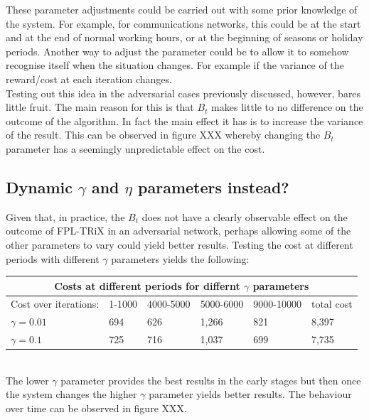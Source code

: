 These parameter adjustments could be carried out with some prior knowledge of the system. For example, for communications networks, this could be at the start and at the end of normal working hours, or at the beginning of seasons or holiday periods. Another way to adjust the parameter could be to allow it to somehow recognise itself when the situation changes. For example if the variance of the reward/cost at each iteration changes.\\

Testing out this idea in the adversarial cases previously discussed, however, bares little fruit. The main reason for this is that $B_t$ makes little to no difference on the outcome of the algorithm. In fact the main effect it has is to increase the variance of the result. This can be observed in figure XXX whereby changing the $B_t$ parameter has a seemingly unpredictable effect on the cost.\\


\subsection{Dynamic $\gamma$ and $\eta$ parameters instead?}

Given that, in practice, the $B_t$ does not have a clearly observable effect on the outcome of FPL-TRiX in an adversarial network, perhaps allowing some of the other parameters to vary could yield better results. Testing the cost at different periods with different $\gamma$ parameters yields the following:\\

\begin{tabular}{ |p{3cm}||p{1.5cm}|p{1.5cm}|p{1.5cm}|p{1.5cm}|p{1.5cm}|  }
 \hline
 \multicolumn{6}{|c|}{Costs at different periods for differnt $\gamma$ parameters}  \\
 \hline
 Cost over  iterations:& 1-1000  & 4000-5000 & 5000-6000 & 9000-10000  & total cost  \\
 \hline
 $\gamma=0.01$        & 694     & 626       & 1,266     & 821         & 8,397       \\
 $\gamma=0.1$         & 725     & 716       & 1,037     & 699         & 7,735       \\
 \hline
\end{tabular}\\

The lower $\gamma$ parameter provides the best results in the early stages but then once the system changes the higher $\gamma$ parameter yields better results. The behaviour over time can be observed in figure XXX.\\


